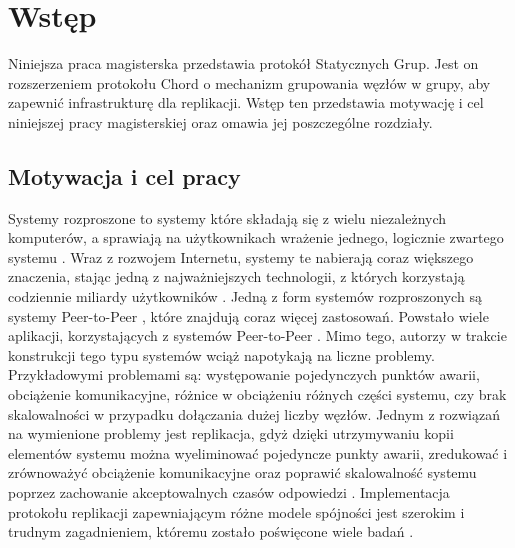 \documentclass[12pt, twoside, openany]{report}
\begin{document}
\chapter{Wstęp}

Niniejsza praca magisterska przedstawia protokół Statycznych Grup. Jest on rozszerzeniem protokołu Chord o mechanizm grupowania węzłów w grupy, aby zapewnić infrastrukturę dla replikacji. Wstęp ten przedstawia motywację i cel niniejszej pracy magisterskiej oraz omawia jej poszczególne rozdziały.


\section{Motywacja i cel pracy}

Systemy rozproszone to systemy które składają się z wielu niezależnych komputerów, a sprawiają na użytkownikach wrażenie jednego, logicznie zwartego systemu \cite{bib:kobusinska}. Wraz z rozwojem Internetu, systemy te nabierają coraz większego znaczenia, stając jedną z najważniejszych technologii, z których  korzystają codziennie miliardy użytkowników \cite{bib:einav, bib:fraiberger, bib:braubach, bib:aws}. Jedną z form systemów rozproszonych są systemy Peer-to-Peer \cite{bib:martins, bib:paiva, bib:kobusinska}, które znajdują coraz więcej zastosowań. Powstało wiele aplikacji, korzystających z systemów Peer-to-Peer \cite{bib:einav, bib:fraiberger, bib:gnutella, bib:kazaa, bib:freehaven, bib:pastry, bib:pier, bib:edutella, bib:jxta}. Mimo tego, autorzy w trakcie konstrukcji tego typu systemów wciąż napotykają na liczne problemy. Przykładowymi problemami \cite{bib:martins} są: występowanie pojedynczych punktów awarii, obciążenie komunikacyjne, różnice w obciążeniu różnych części systemu, czy brak skalowalności w przypadku dołączania dużej liczby węzłów. Jednym z rozwiązań na wymienione problemy jest replikacja, gdyż dzięki utrzymywaniu kopii elementów systemu można wyeliminować pojedyncze punkty awarii, zredukować i zrównoważyć obciążenie komunikacyjne oraz poprawić skalowalność systemu poprzez zachowanie akceptowalnych czasów odpowiedzi \cite{bib:martins}. Implementacja protokołu replikacji zapewniającym różne modele spójności jest szerokim i trudnym zagadnieniem, któremu zostało poświęcone wiele badań \cite{bib:martins, bib:jeyasheeli, bib:ye, bib:paiva, bib:pace, bib:cherbal, bib:shafaat, bib:ktari, bib:tsai,bib:scatter, bib:rollerchain}.
\end{document}
